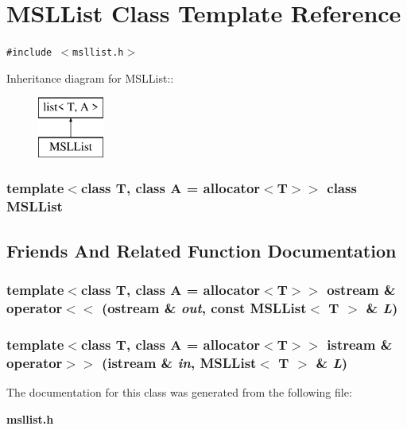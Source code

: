 \section{MSLList  Class Template Reference}
\label{classMSLList}
{\tt \#include $<$msllist.h$>$}

Inheritance diagram for MSLList::\begin{figure}[H]
\begin{center}
\leavevmode
\includegraphics[height=2cm]{classMSLList}
\end{center}
\end{figure}
\subsubsection*{template$<$class T, class A = allocator$<$T$>$$>$  class MSLList}



\subsection{Friends And Related Function Documentation}
\subsubsection{\setlength{\rightskip}{0pt plus 5cm}template$<$class T, class A = allocator$<$T$>$$>$ ostream \& operator$<$$<$ (ostream \& {\em out}, const MSLList$<$ T $>$ \& {\em L})\hspace{0.3cm}{\tt  [friend]}}\label{classMSLList_l0}


\subsubsection{\setlength{\rightskip}{0pt plus 5cm}template$<$class T, class A = allocator$<$T$>$$>$ istream \& operator$>$$>$ (istream \& {\em in}, MSLList$<$ T $>$ \& {\em L})\hspace{0.3cm}{\tt  [friend]}}\label{classMSLList_l1}




The documentation for this class was generated from the following file:\begin{CompactItemize}
\item 
{\bf msllist.h}\end{CompactItemize}
